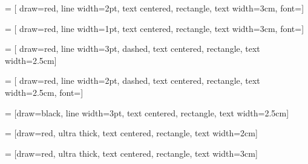    = [	draw=red,         %
						line width=2pt,   %
						text centered,
						rectangle,        %
						text width=3cm,
						font=\fontsize{15}{0}\selectfont] %
						
   = [	draw=red,         %
line width=1pt,   %
text centered,
rectangle,        %
text width=3cm,
font=\fontsize{15}{0}\selectfont] %

                     
   = [	draw=red,         %
						line width=3pt,   %
						dashed,			  %
						text centered,
						rectangle,        %
						text width=2.5cm] %
						
   = [	draw=red,         %
line width=2pt,   %
dashed,			  %
text centered,
rectangle,        %
text width=2.5cm,
font=\fontsize{30}{0}\selectfont] %


    = [draw=black,         %
					 line width=3pt,   %
					 text centered,
					 rectangle,        %
					 text width=2.5cm] %

 = [draw=red,         %
                     ultra thick,   %
                     text centered,
                     rectangle,        %
                     text width=2cm] %

  = [draw=red,       %
                     ultra thick, %
                     text centered,  
                     rectangle,      %
                     text width=3cm] %

